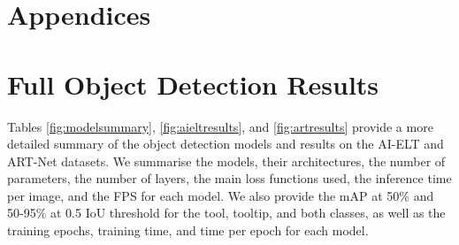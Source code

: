 \section{Appendices}

\appendix

\section{Full Object Detection Results}

Tables \ref{fig:modelsummary}, \ref{fig:aieltresults}, and \ref{fig:artresults} provide a more detailed summary of the object detection models and results on the AI-ELT and ART-Net datasets. We summarise the models, their architectures, the number of parameters, the number of layers, the main loss functions used, the inference time per image, and the FPS for each model. We also provide the mAP at 50\% and 50-95\% at 0.5 IoU threshold for the tool, tooltip, and both classes, as well as the training epochs, training time, and time per epoch for each model.

